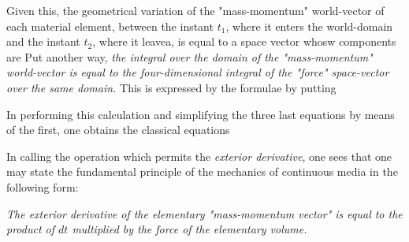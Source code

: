 Given this, the geometrical variation of the "mass-momentum" world-vector of each material element, between the instant $t_1$, where it enters the world-domain and the instant $t_2$, where it leavea, is equal to a space vector whosw components are
Put another way, \textit{the integral over the domain of the "mass-momentum" world-vector is equal to the four-dimensional integral of the "force" space-vector over the same domain.} This is expressed by the formulae
by putting

In performing this calculation and simplifying the three last equations by means of the first, one obtains the classical equations

In calling the operation which permits  the \textit{exterior derivative}, one sees that one may state the fundamental principle of the mechanics of continuous media in the following form:

\textit{The exterior derivative of the elementary "mass-momentum vector" is equal to the product of $dt$ multiplied by the force of the elementary volume.}
